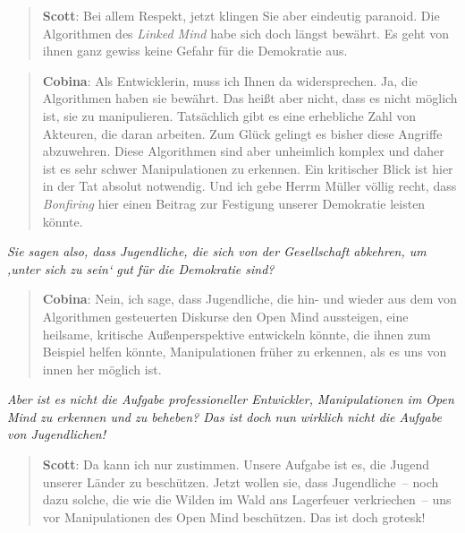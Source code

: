 \documentclass{scrartcl}
\newenvironment{frage}{\itshape}{}
\newenvironment{antworta}{
  \begin{quotation}
  }{
  \end{quotation}
}
\newenvironment{antwortb}{
  \begin{quotation}
  }{
  \end{quotation}
}
\newcommand{\name}[1]{\textbf{#1}}
\begin{document}
\begin{antwortb}
\name{Scott}: Bei allem Respekt, jetzt klingen Sie aber eindeutig
paranoid. Die Algorithmen des \emph{Linked Mind} habe sich doch
längst bewährt. Es geht von ihnen ganz gewiss keine Gefahr
für die Demokratie aus.
\end{antwortb}


\begin{antworta}
\name{Cobina}: Als Entwicklerin, muss ich Ihnen da
widersprechen. Ja, die Algorithmen haben sie bewährt. Das
heißt aber nicht, dass es nicht möglich ist, sie zu
manipulieren. Tatsächlich gibt es eine erhebliche Zahl von
Akteuren, die daran arbeiten. Zum Glück gelingt es bisher
diese Angriffe abzuwehren. Diese Algorithmen sind aber
unheimlich komplex und daher ist es sehr schwer
Manipulationen zu erkennen. Ein kritischer Blick ist hier in
der Tat absolut notwendig. Und ich gebe Herrm Müller völlig
recht, dass \emph{Bonfiring} hier einen Beitrag zur Festigung
unserer Demokratie leisten könnte.
\end{antworta}


\begin{frage}
Sie sagen also, dass Jugendliche, die sich von der
Gesellschaft abkehren, um ‚unter sich zu sein‘ gut für die
Demokratie sind?
\end{frage}


\begin{antworta}
\name{Cobina}: Nein, ich sage, dass Jugendliche, die hin- und
wieder aus dem von Algorithmen gesteuerten Diskurse den Open
Mind aussteigen, eine heilsame, kritische Außenperspektive
entwickeln könnte, die ihnen zum Beispiel helfen könnte,
Manipulationen früher zu erkennen, als es uns von innen her
möglich ist.
\end{antworta}


\begin{frage}
Aber ist es nicht die Aufgabe professioneller Entwickler,
Manipulationen im \emph{Open Mind} zu erkennen und zu beheben? Das
ist doch nun wirklich nicht die Aufgabe von Jugendlichen!
\end{frage}


\begin{antworta}
\name{Scott}: Da kann ich nur zustimmen. Unsere Aufgabe ist es, die
Jugend unserer Länder zu beschützen. Jetzt wollen sie, dass
Jugendliche~– noch dazu solche, die wie die Wilden im Wald
ans Lagerfeuer verkriechen~– uns vor Manipulationen des Open
Mind beschützen. Das ist doch grotesk!
\end{antworta}
\end{document}
